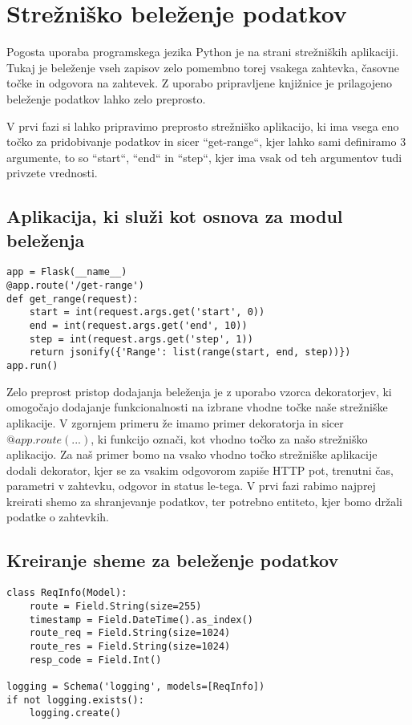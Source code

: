 \documentclass[a4paper,12pt,openright]{book}
\begin{document}
    \section{Strežniško beleženje podatkov}

    Pogosta uporaba programskega jezika Python je na strani strežniških aplikaciji. Tukaj je beleženje vseh zapisov zelo pomembno torej vsakega zahtevka, časovne točke in odgovora na zahtevek. Z uporabo pripravljene knjižnice je prilagojeno beleženje podatkov lahko zelo preprosto.

    V prvi fazi si lahko pripravimo preprosto strežniško aplikacijo, ki ima vsega eno točko za pridobivanje podatkov in sicer ``get-range``, kjer lahko sami definiramo 3 argumente, to so ``start``, ``end`` in ``step``, kjer ima vsak od teh argumentov tudi privzete vrednosti.

    \subsection{Aplikacija, ki služi kot osnova za modul beleženja}
\begin{verbatim}
app = Flask(__name__)
@app.route('/get-range')
def get_range(request):
    start = int(request.args.get('start', 0))
    end = int(request.args.get('end', 10))
    step = int(request.args.get('step', 1))
    return jsonify({'Range': list(range(start, end, step))})
app.run()
\end{verbatim}

    \noindent
    Zelo preprost pristop dodajanja beleženja je z uporabo vzorca dekoratorjev, ki omogočajo dodajanje funkcionalnosti na izbrane vhodne točke naše strežniške aplikacije. V zgornjem primeru že imamo primer dekoratorja in sicer $@app.route(...)$, ki funkcijo označi, kot vhodno točko za našo strežniško aplikacijo. Za naš primer bomo na vsako vhodno točko strežniške aplikacije dodali dekorator, kjer se za vsakim odgovorom zapiše HTTP pot, trenutni čas, parametri v zahtevku, odgovor in status le-tega. V prvi fazi rabimo najprej kreirati shemo za shranjevanje podatkov, ter potrebno entiteto, kjer bomo držali podatke o zahtevkih.

    \subsection{Kreiranje sheme za beleženje podatkov}
\begin{verbatim}
class ReqInfo(Model):
    route = Field.String(size=255)
    timestamp = Field.DateTime().as_index()
    route_req = Field.String(size=1024)
    route_res = Field.String(size=1024)
    resp_code = Field.Int()

logging = Schema('logging', models=[ReqInfo])
if not logging.exists():
    logging.create()
\end{verbatim}
\end{document}
